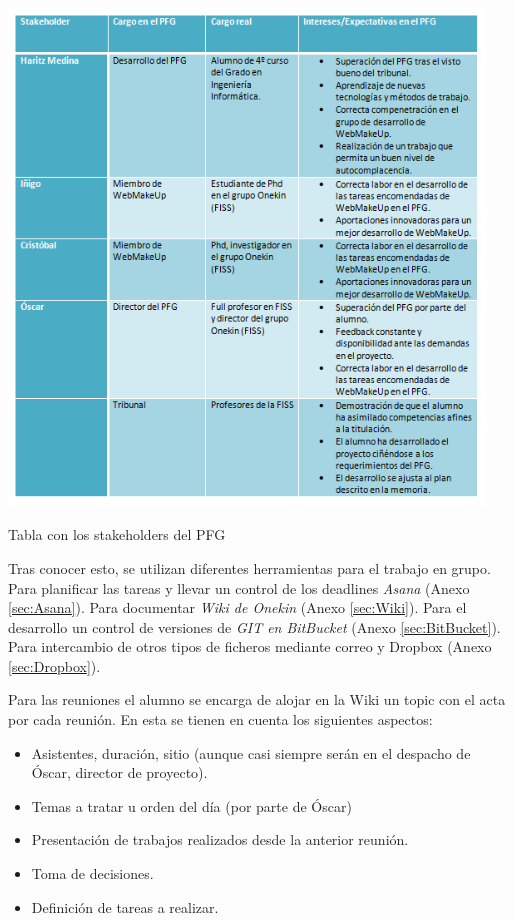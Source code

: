 \begin{table}
\begin{center}
\includegraphics[width=0.95\textwidth]{figs/6-Stakeholders.png}
\end{center}
\caption{Tabla con los stakeholders del PFG}
\label{tab:Stakeholders}
\end{table}

Tras conocer esto, se utilizan diferentes herramientas para el trabajo en grupo. Para planificar las tareas y llevar un control de los deadlines \emph{Asana} (Anexo \ref{sec:Asana}). Para documentar \emph{Wiki de Onekin} (Anexo \ref{sec:Wiki}). Para el desarrollo un control de versiones de \emph{GIT en BitBucket} (Anexo \ref{sec:BitBucket}). Para intercambio de otros tipos de ficheros mediante correo y Dropbox (Anexo \ref{sec:Dropbox}).

Para las reuniones el alumno se encarga de alojar en la Wiki un topic con el acta por cada reunión. En esta se tienen en cuenta los siguientes aspectos:
\begin{itemize}
\item{Asistentes, duración, sitio (aunque casi siempre serán en el despacho de Óscar, director de proyecto).}
\item{Temas a tratar u orden del día (por parte de Óscar)}
\item{Presentación de trabajos realizados desde la anterior reunión.}
\item{Toma de decisiones.}
\item{Definición de tareas a realizar.}
\end{itemize}

